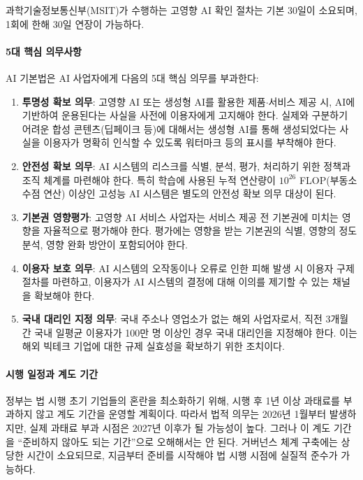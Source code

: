 과학기술정보통신부(MSIT)가 수행하는 고영향 AI 확인 절차는 기본 30일이 소요되며, 1회에 한해 30일 연장이 가능하다.

\paragraph{5대 핵심 의무사항}
AI 기본법은 AI 사업자에게 다음의 5대 핵심 의무를 부과한다:

\begin{enumerate}
    \item \textbf{투명성 확보 의무}: 고영향 AI 또는 생성형 AI를 활용한 제품$\cdot$서비스 제공 시, AI에 기반하여 운용된다는 사실을 사전에 이용자에게 고지해야 한다. 실제와 구분하기 어려운 합성 콘텐츠(딥페이크 등)에 대해서는 생성형 AI를 통해 생성되었다는 사실을 이용자가 명확히 인식할 수 있도록 워터마크 등의 표시를 부착해야 한다.
    \item \textbf{안전성 확보 의무}: AI 시스템의 리스크를 식별, 분석, 평가, 처리하기 위한 정책과 조직 체계를 마련해야 한다. 특히 학습에 사용된 누적 연산량이 $10^{26}$ FLOP(부동소수점 연산) 이상인 고성능 AI 시스템은 별도의 안전성 확보 의무 대상이 된다.
    \item \textbf{기본권 영향평가}: 고영향 AI 서비스 사업자는 서비스 제공 전 기본권에 미치는 영향을 자율적으로 평가해야 한다. 평가에는 영향을 받는 기본권의 식별, 영향의 정도 분석, 영향 완화 방안이 포함되어야 한다.
    \item \textbf{이용자 보호 의무}: AI 시스템의 오작동이나 오류로 인한 피해 발생 시 이용자 구제 절차를 마련하고, 이용자가 AI 시스템의 결정에 대해 이의를 제기할 수 있는 채널을 확보해야 한다.
    \item \textbf{국내 대리인 지정 의무}: 국내 주소나 영업소가 없는 해외 사업자로서, 직전 3개월간 국내 일평균 이용자가 100만 명 이상인 경우 국내 대리인을 지정해야 한다. 이는 해외 빅테크 기업에 대한 규제 실효성을 확보하기 위한 조치이다.
\end{enumerate}

\paragraph{시행 일정과 계도 기간}
정부는 법 시행 초기 기업들의 혼란을 최소화하기 위해, 시행 후 1년 이상 과태료를 부과하지 않고 계도 기간을 운영할 계획이다. 따라서 법적 의무는 2026년 1월부터 발생하지만, 실제 과태료 부과 시점은 2027년 이후가 될 가능성이 높다. 그러나 이 계도 기간을 ``준비하지 않아도 되는 기간''으로 오해해서는 안 된다. 거버넌스 체계 구축에는 상당한 시간이 소요되므로, 지금부터 준비를 시작해야 법 시행 시점에 실질적 준수가 가능하다.


